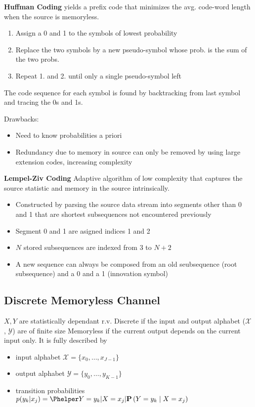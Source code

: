 \documentclass[a4paper, fontsize=8pt, landscape, DIV=1]{scrartcl}
\begin{document}
\begin{multicols*}{4}
  \textbf{Huffman Coding} yields a prefix code that minimizes the avg. code-word length when the
  source is memoryless.
  \begin{enumerate}
    \item Assign a 0 and 1 to the symbols of lowest probability
    \item Replace the two symbols by a new pseudo-symbol whose prob. is the sum of the two probs.
    \item Repeat 1. and 2. until only a single pseudo-symbol left
  \end{enumerate}
  The code sequence for each symbol is found by backtracking from last symbol and tracing the 0s and 1s.

  Drawbacks:
  \begin{itemize}
    \item Need to know probabilities a priori
    \item Redundancy due to memory in source can only be removed by using large extension codes, increasing
    complexity
  \end{itemize}

  \textbf{Lempel-Ziv Coding} Adaptive algorithm of low complexity that captures the source statistic and memory
  in the source intrinsically.

  \begin{itemize}
    \item Constructed by parsing the source data stream into segments other than 0 and 1 that
    are shortest subsequences not encountered previously
    \item Segment 0 and 1 are asigned indices 1 and 2
    \item $N$ stored subsequences are indexed from $3$ to $N+2$
    \item A new sequence can always be composed from an old seubsequence (root subsequence) and a 0
    and a 1 (innovation symbol)
  \end{itemize}


  \subsection{Discrete Memoryless Channel}

  $X,Y$ are statistically dependant r.v.
  Discrete if the input and output alphabet ($\mathcal{X}$, $\mathcal{Y}$) are of finite size
  Memoryless if the current output depends on the current input only.
  It is fully described by
  \begin{itemize}
    \item input alphabet $\mathcal{X}=\{x_0,\dots,x_{J-1}\}$
    \item output alphabet $\mathcal{Y}=\{y_0,\dots,y_{K-1}\}$
    \item transition probabilities $p(y_k|x_j) = \P(Y=y_k | X = x_j)$
  \end{itemize}


\end{multicols*}
\end{document}
